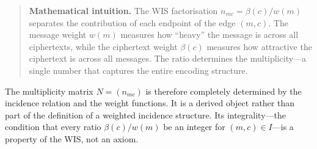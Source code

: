 \begin{quote}
\textbf{Mathematical intuition.}
The WIS factorisation $n_{mc}=\beta(c)/w(m)$ separates the contribution of each endpoint of the edge $(m,c)$.
The message weight $w(m)$ measures how ``heavy'' the message is across all ciphertexts, while the ciphertext weight $\beta(c)$ measures how attractive the ciphertext is across all messages.
The ratio determines the multiplicity---a single number that captures the entire encoding structure.
\end{quote}
The multiplicity matrix $N=(n_{mc})$ is therefore completely determined by the incidence relation and the weight functions.  It is a derived object rather than part of the definition of a weighted incidence structure.  Its integrality---the condition that every ratio $\beta(c)/w(m)$ be an integer for $(m,c)\in I$---is a property of the WIS, not an axiom.
